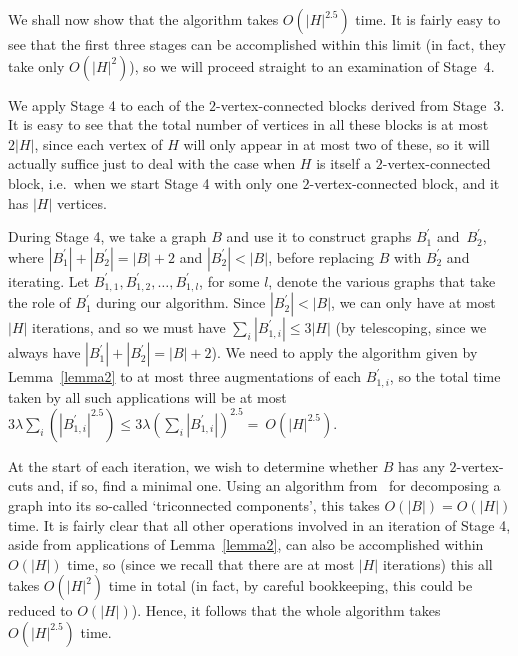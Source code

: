 \documentclass{article}
\newtheorem{Proof of Theorem}{Proof of Theorem}
\begin{document}
We shall now show that the algorithm takes $O \left( |H|^{2.5} \right)$ time.
It is fairly easy to see that the first three stages can be accomplished within this limit
(in fact, they take only $O \left( |H|^{2} \right)$),
so we will proceed straight to an examination of Stage~4.

We apply Stage 4 to each of the $2$-vertex-connected blocks derived from Stage~3.
It is easy to see that the total number of vertices in all these blocks is at most $2|H|$,
since each vertex of $H$ will only appear in at most two of these,
so it will actually suffice just to deal with the case when $H$ is itself a $2$-vertex-connected block,
i.e.~when we start Stage 4 with only one $2$-vertex-connected block,
and it has $|H|$ vertices.

During Stage 4,
we take a graph $B$
and use it to construct graphs $B_{1}^{\prime}$ and~$B_{2}^{\prime}$,
where $|B_{1}^{\prime}| + |B_{2}^{\prime}| = |B|+2$
and $|B_{2}^{\prime}| < |B|$,
before replacing $B$ with $B_{2}^{\prime}$ and iterating.
Let $B_{1,1}^{\prime},B_{1,2}^{\prime}, \ldots, B_{1,l}^{\prime}$, for some $l$, 
denote the various graphs that take the role of $B_{1}^{\prime}$ during our algorithm.
Since $|B_{2}^{\prime}| < |B|$,
we can only have at most $|H|$ iterations,
and so we must have $\sum_{i} |B_{1,i}^{\prime}| \leq 3|H|$
(by telescoping, since we always have $|B_{1}^{\prime}| + |B_{2}^{\prime}| = |B|+2$).
We need to apply the algorithm given by Lemma~\ref{lemma2}
to at most three augmentations of each $B_{1,i}^{\prime}$,
so the total time taken by all such applications will be at most
$3\lambda \sum_{i} \left( |B_{1,i}^{\prime}|^{2.5} \right) 
\leq 3\lambda \left( \sum_{i}|B_{1,i}^{\prime}| \right)^{2.5}=~O \left( |H|^{2.5} \right)$.

At the start of each iteration,
we wish to determine whether $B$ has any $2$-vertex-cuts and,
if so, find a minimal one.
Using an algorithm from~\cite{hop} for decomposing a
graph into its so-called `triconnected components',
this takes $O(|B|)=O(|H|)$ time.
It is fairly clear that all other operations involved in an iteration of Stage 4,
aside from applications of Lemma~\ref{lemma2},
can also be accomplished within $O(|H|)$ time,
so (since we recall that there are at most $|H|$ iterations)
this all takes $O \left( |H|^{2} \right)$ time in total
(in fact, by careful bookkeeping, this could be reduced to $O(|H|)$).
Hence,
it follows that the whole algorithm takes $O \left( |H|^{2.5} \right)$ time.
\end{document}
